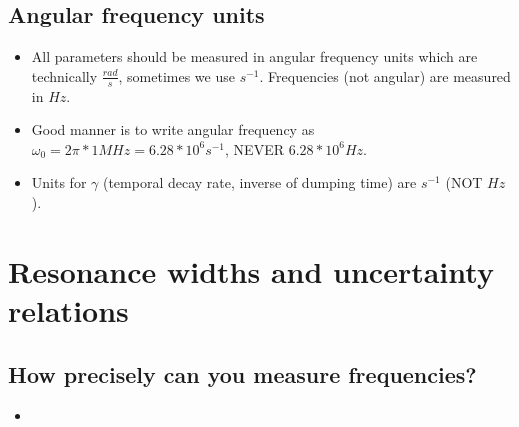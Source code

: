 	\subsection{Angular frequency units}
		\begin{itemize}
			\item All parameters should be measured in angular frequency units which are technically $\frac{rad}{s}$, sometimes we use $s^{-1}$. Frequencies (not angular) are measured in $Hz$.
			\item Good manner is to write angular frequency as $\omega_0 = 2\pi*1MHz = 6.28 * 10^6 s^{-1}$, NEVER $6.28 * 10^{6} Hz$.
			\item Units for $\gamma$ (temporal decay rate, inverse of dumping time) are $s^{-1}$ (NOT $Hz$).
		\end{itemize}
\section{Resonance widths and uncertainty relations}
	\subsection{How precisely can you measure frequencies?}
		\begin{itemize}
			\item
		\end{itemize}
